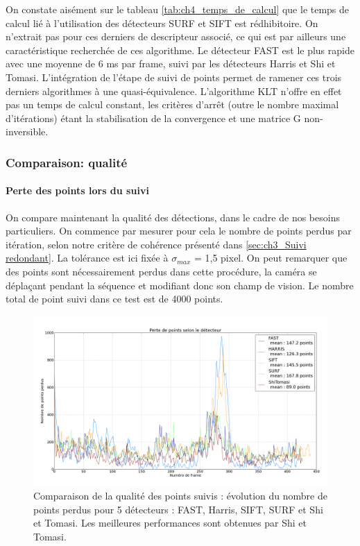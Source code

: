 On constate aisément sur le tableau \ref{tab:ch4_temps_de_calcul} que le temps de calcul lié à l'utilisation des détecteurs SURF et SIFT est rédhibitoire. On n'extrait pas pour ces derniers de descripteur associé, ce qui est par ailleurs une caractéristique recherchée de ces algorithme. Le détecteur FAST est le plus rapide avec une moyenne de 6 ms par frame, suivi par les détecteurs Harris et \og Shi et Tomasi\fg{}. L'intégration de l'étape de suivi de points permet de ramener ces trois derniers algorithmes à une quasi-équivalence. L'algorithme KLT n'offre en effet pas un temps de calcul constant, les critères d'arrêt (outre le nombre maximal d'itérations) étant la stabilisation de la convergence et une matrice G non-inversible.

\subsubsection{Comparaison: qualité}
\paragraph{Perte des points lors du suivi\\}
On compare maintenant la qualité des détections, dans le cadre de nos besoins particuliers. On commence par mesurer pour cela le nombre de points perdus par itération, selon notre critère de cohérence présenté dans \ref{sec:ch3_Suivi redondant}. La tolérance est ici fixée à $\sigma_{max}$ = 1,5 pixel. On peut remarquer que des points sont nécessairement perdus dans cette procédure, la caméra se déplaçant pendant la séquence et modifiant donc son champ de vision. Le nombre total de point suivi dans ce test est de 4000 points.

\begin{figure}[h]
	\centerline{\includegraphics[width=\textwidth]{Chapter3/graphics/Detectors_comparison_q_clean.png}}
	\caption{Comparaison de la qualité des points suivis : évolution du nombre de points perdus pour 5 détecteurs : FAST, Harris, SIFT, SURF et Shi et Tomasi. Les meilleures performances sont obtenues par Shi et Tomasi.}
	\label{fig:ch3_Vision_robustesse}
\end{figure}

